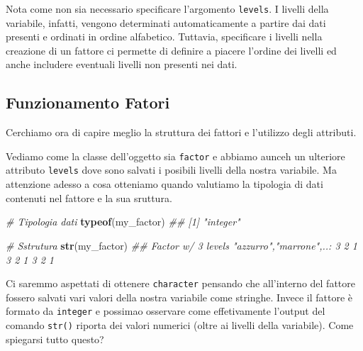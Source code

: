 \documentclass[
]{book}
\newenvironment{Shaded}{\begin{snugshade}}{\end{snugshade}}
\newcommand{\CommentTok}[1]{\textcolor[rgb]{0.56,0.35,0.01}{\textit{#1}}}
\newcommand{\KeywordTok}[1]{\textcolor[rgb]{0.13,0.29,0.53}{\textbf{#1}}}
\newcommand{\NormalTok}[1]{#1}
\begin{document}
Nota come non sia necessario specificare l'argomento \texttt{levels}. I livelli della variabile, infatti, vengono determinati automaticamente a partire dai dati presenti e ordinati in ordine alfabetico. Tuttavia, specificare i livelli nella creazione di un fattore ci permette di definire a piacere l'ordine dei livelli ed anche includere eventuali livelli non presenti nei dati.

\hypertarget{funzionamento-fatori}{%
\subsection{Funzionamento Fatori}\label{funzionamento-fatori}}

Cerchiamo ora di capire meglio la struttura dei fattori e l'utilizzo degli attributi.

\begin{Shaded}
\end{Shaded}

Vediamo come la classe dell'oggetto sia \texttt{factor} e abbiamo aunceh un ulteriore attributo \texttt{levels} dove sono salvati i posibili livelli della nostra variabile. Ma attenzione adesso a cosa otteniamo quando valutiamo la tipologia di dati contenuti nel fattore e la sua sruttura.

\begin{Shaded}
\begin{Highlighting}[]
\CommentTok{# Tipologia dati}
\KeywordTok{typeof}\NormalTok{(my_factor)}
\CommentTok{## [1] "integer"}

\CommentTok{# Sstrutura}
\KeywordTok{str}\NormalTok{(my_factor)}
\CommentTok{##  Factor w/ 3 levels "azzurro","marrone",..: 3 2 1 3 2 1 3 2 1}
\end{Highlighting}
\end{Shaded}

Ci saremmo aspettati di ottenere \texttt{character} pensando che all'interno del fattore fossero salvati vari valori della nostra variabile come stringhe. Invece il fattore è formato da \texttt{integer} e possimao osservare come effetivamente l'output del comando \texttt{str()} riporta dei valori numerici (oltre ai livelli della variabile). Come spiegarsi tutto questo?
\end{document}
